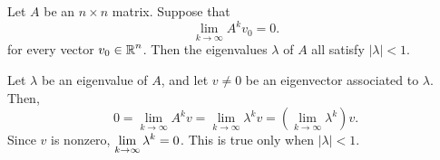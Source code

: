 \documentclass{ximera}
\begin{document}
\begin{exercise} \label{c10.6.1}
Let $A$ be an $n\times n$ matrix.   Suppose that 
\[
\lim_{k\to\infty} A^kv_0 = 0.
\]
for every vector $v_0\in\mbox{$\Bbb{R}$}^n$.  Then the eigenvalues $\lambda$ of $A$ all
satisfy $|\lambda|<1$.

\begin{solution}

Let $\lambda$ be an eigenvalue of $A$, and let $v \neq 0$ be an eigenvector
associated to $\lambda$.  Then,
\[
0 = \lim_{k \to \infty}A^kv = \lim_{k \to \infty}\lambda^kv
= \left(\lim_{k \to \infty}\lambda^k\right)v.
\]
Since $v$ is nonzero,
$\displaystyle \lim_{k \to \infty}\lambda^k = 0$.  This is true only when
$|\lambda| < 1$.



 


\end{solution}
\end{exercise}
\end{document}
